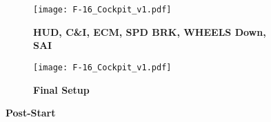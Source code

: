 \documentclass[fontInter]{TechCheck}
\begin{document}
	\begin{figure}[h]
		\centering
		\begin{subfigure}[t]{0.45\linewidth}
			\centering
			\texttt{[image: F-16\_Cockpit\_v1.pdf]}
			\caption*{\textbf{HUD, C\&I, ECM, SPD BRK, WHEELS Down, SAI}}
		\end{subfigure}
		\begin{subfigure}[t]{0.45\linewidth}
			\centering
			\texttt{[image: F-16\_Cockpit\_v1.pdf]}
			\caption*{\textbf{Final Setup}}
		\end{subfigure}
		\caption{\textbf{Post-Start}}
		\label{fig:proc:poststart5}
	\end{figure}

	\clearpage


	\clearpage
\end{document}
